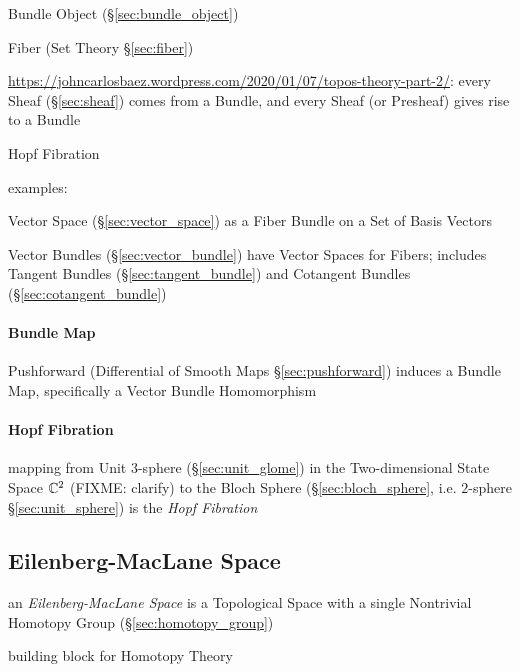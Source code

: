 \fist Bundle Object (\S\ref{sec:bundle_object})

\fist Fiber (Set Theory \S\ref{sec:fiber})

\url{https://johncarlosbaez.wordpress.com/2020/01/07/topos-theory-part-2/}:
every Sheaf (\S\ref{sec:sheaf}) comes from a Bundle, and every Sheaf (or
Presheaf) gives rise to a Bundle

Hopf Fibration

examples:

Vector Space (\S\ref{sec:vector_space}) as a Fiber Bundle on a Set of Basis
Vectors

Vector Bundles (\S\ref{sec:vector_bundle}) have Vector Spaces for Fibers;
includes Tangent Bundles (\S\ref{sec:tangent_bundle}) and Cotangent Bundles
(\S\ref{sec:cotangent_bundle})




\paragraph{Bundle Map}\label{sec:bundle_map}\hfill

Pushforward (Differential of Smooth Maps \S\ref{sec:pushforward}) induces a
Bundle Map, specifically a Vector Bundle Homomorphism



\paragraph{Hopf Fibration}\label{sec:hopf_fibration}\hfill

mapping from Unit $3$-sphere (\S\ref{sec:unit_glome}) in the Two-dimensional
State Space $\mathbb{C}^2$ (FIXME: clarify) to the Bloch Sphere
(\S\ref{sec:bloch_sphere}, i.e. $2$-sphere \S\ref{sec:unit_sphere}) is the
\emph{Hopf Fibration}



\subsection{Eilenberg-MacLane Space}\label{sec:eilenberg_maclane_space}

an \emph{Eilenberg-MacLane Space} is a Topological Space with a single
Nontrivial Homotopy Group (\S\ref{sec:homotopy_group})

building block for Homotopy Theory

